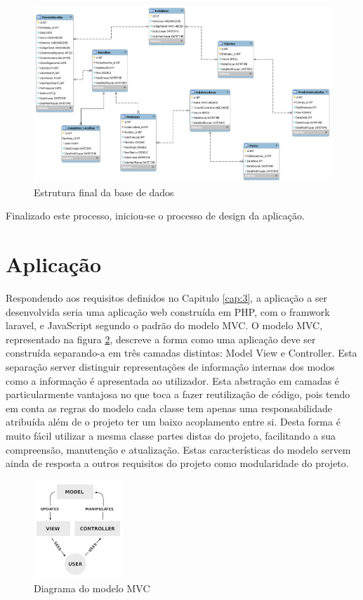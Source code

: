 \begin{figure}[htbp] 
	\begin{center}
		\includegraphics[width=\textwidth,keepaspectratio]{figuras/DB_Model/new.png}
		\caption{Estrutura final da base de dados}
		\label{fig:db_model} 
	\end{center}
\end{figure}

Finalizado este processo, iniciou-se o processo de design da aplicação.

\section{Aplicação}
Respondendo aos requisitos definidos no Capitulo \ref{cap:3}, a aplicação a ser desenvolvida seria uma aplicação web construída em PHP, com o framwork laravel, e JavaScript segundo o padrão do modelo MVC. O modelo MVC, representado na figura \ref{fig:mvc}, descreve a forma como uma aplicação deve ser construída separando-a em três camadas distintas: Model View e Controller. Esta separação server distinguir representações de informação internas dos modos como a informação é apresentada ao utilizador\cite{Wikipediad}.
Esta abstração em camadas é particularmente vantajosa no que toca a fazer reutilização de código, pois tendo em conta as regras do modelo cada classe tem apenas uma responsabilidade atribuída além de o projeto ter um baixo acoplamento entre si. Desta forma é muito fácil utilizar a mesma classe partes distas do projeto, facilitando a sua compreensão, manutenção e atualização.
Estas características do modelo servem ainda de resposta a outros requisitos do projeto como modularidade do projeto.
\begin{figure}[H] 
	\begin{center}
		\includegraphics[width=0.30\textwidth,keepaspectratio]{figuras/mvc.png}
		\caption{Diagrama do modelo MVC}
		\label{fig:mvc} 
	\end{center}
\end{figure}

